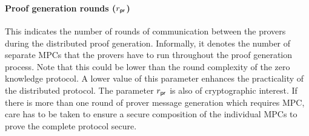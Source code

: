 \paragraph{Proof generation rounds ($r_\mathsf{pr}$)}
This indicates the number of rounds of communication between the provers during
the distributed proof generation. Informally, it denotes the number of separate
MPCs that the provers have to run throughout the proof generation process. Note
that this could be lower than the round complexity of the zero knowledge
protocol. A lower value of this parameter enhances the practicality of the
distributed protocol.
The parameter $r_\mathsf{pr}$ is also of cryptographic interest. If there is more than one round of prover message generation which requires MPC, care has to be taken to ensure a secure composition of the individual MPCs to prove the complete protocol secure.

